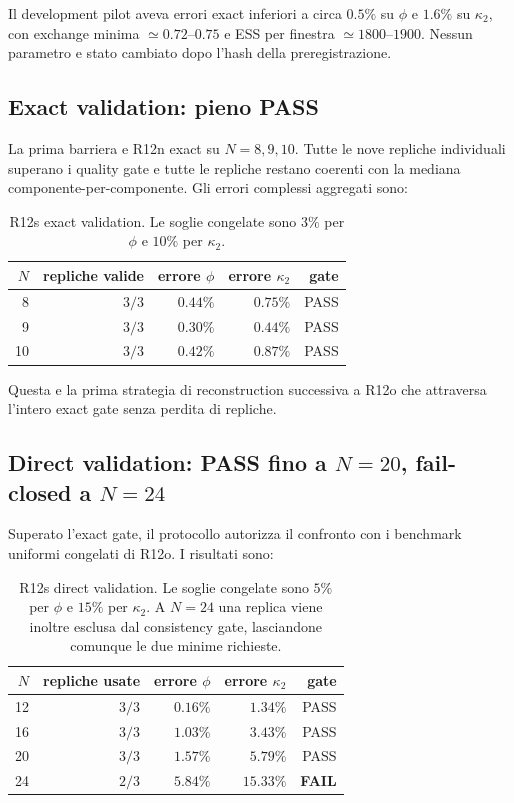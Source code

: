 \documentclass[11pt,a4paper]{article}
\begin{document}
Il development pilot aveva errori exact inferiori a circa $0.5\%$ su $\phi$ e $1.6\%$ su $\kappa_2$, con exchange minima $\simeq0.72$--$0.75$ e ESS per finestra $\simeq1800$--$1900$. Nessun parametro e stato cambiato dopo l'hash della preregistrazione.

\subsection{Exact validation: pieno PASS}

La prima barriera e R12n exact su $N=8,9,10$. Tutte le nove repliche individuali superano i quality gate e tutte le repliche restano coerenti con la mediana componente-per-componente. Gli errori complessi aggregati sono:
\begin{table}[htbp]
\centering
\small
\begin{tabular}{rrrrr}
\toprule
$N$ & repliche valide & errore $\phi$ & errore $\kappa_2$ & gate \\
\midrule
8  & $3/3$ & $0.44\%$ & $0.75\%$ & PASS \\
9  & $3/3$ & $0.30\%$ & $0.44\%$ & PASS \\
10 & $3/3$ & $0.42\%$ & $0.87\%$ & PASS \\
\bottomrule
\end{tabular}
\caption{R12s exact validation. Le soglie congelate sono $3\%$ per $\phi$ e $10\%$ per $\kappa_2$.}
\end{table}
Questa e la prima strategia di reconstruction successiva a R12o che attraversa l'intero exact gate senza perdita di repliche.

\subsection{Direct validation: PASS fino a $N=20$, fail-closed a $N=24$}

Superato l'exact gate, il protocollo autorizza il confronto con i benchmark uniformi congelati di R12o. I risultati sono:
\begin{table}[htbp]
\centering
\small
\begin{tabular}{rrrrr}
\toprule
$N$ & repliche usate & errore $\phi$ & errore $\kappa_2$ & gate \\
\midrule
12 & $3/3$ & $0.16\%$ & $1.34\%$ & PASS \\
16 & $3/3$ & $1.03\%$ & $3.43\%$ & PASS \\
20 & $3/3$ & $1.57\%$ & $5.79\%$ & PASS \\
24 & $2/3$ & $5.84\%$ & $15.33\%$ & \textbf{FAIL} \\
\bottomrule
\end{tabular}
\caption{R12s direct validation. Le soglie congelate sono $5\%$ per $\phi$ e $15\%$ per $\kappa_2$. A $N=24$ una replica viene inoltre esclusa dal consistency gate, lasciandone comunque le due minime richieste.}
\end{table}
\end{document}
